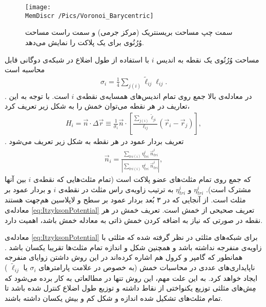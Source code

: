 \begin{figure}[htbp]
\begin{center}
\texttt{[image: \\MemDiscr /Pics/Voronoi\_Barycentric]}

\caption{
سمت چپ مساحت بریسنتریک (مرکز جرمی) و سمت راست مساحت وُرُنُوی برای یک پلاکت را نمایش می‌دهد.
}
\label{fig:voronoiBarycentric}
\end{center}
\end{figure}
مساحت وُرُنُوی
یک نقطه به اندیس 
$i$
با استفاده از طول اضلاع در شبکه‌ی دوگانی قابل محاسبه است
\begin{eqnarray}
\sigma_i=\frac{1}{4}\sum_{j(i)}\tilde\ell_{ij}\ell_{ij}.
\label{eq:voronoiArea}
\end{eqnarray}
. در معادله‌ی بالا جمع روی تمام اندیس‌های همسایه‌ی نقطه‌ی 
$i$
است. با توجه به این تعاریف در هر نقطه می‌توان خمش را به شکل زیر تعریف کرد،
\begin{eqnarray}
H_i=\vec n\cdot\Delta \vec r\equiv\frac{1}{\sigma_i}\vec n \cdot\left[\frac{\sum_{j(i)}\tilde\ell_{ji}}{\ell_{ij}}(\vec r_i-\vec r_j)\right],
\label{eq:meanCurvatureDiscreteSingleVertex}
\end{eqnarray}
. تعریف بردار عمود در هر نقطه به شکل زیر تعریف می‌شود
\cite{Thurrner1998NormalVec}
\begin{eqnarray}
\vec n_i=\frac{\sum_{tri(i)} \eta_{tri}^i~\vec n_{tri}^i}{|\sum_{tri(i)} \eta_{tri}^i~\vec n_{tri}^i|},
\label{eq:noramlVector}
\end{eqnarray}
که جمع روی تمام مثلث‌های عضو پلاکت
است (تمام مثلث‌هایی که نقطه‌ی 
$i$
بین آنها مشترک است). 
$\eta_{tri}^i$
و
$\eta_{tri}^i$
به ترتیب زاویه‌ی راس مثلث در نقطه‌ی 
$i$
و بردار عمود بر مثلث است. از آنجایی که در ۳ بُعد بردار عمود بر سطح و لاپلاسین هم‌جهت هستند
\cite{Gompper1996}
معادله‌ی 
\ref{eq:ItzyksonPotential}
تعریف صحیحی از خمش است. تعریف خمش در هر نقطه در صورتی که نیاز به  اضافه کردن خمش ذاتی به معادله خمش باشد، اهمیت دارد. 

معادله‌ی
\ref{eq:ItzyksonPotential}
برای شبکه‌های مثلثی در نظر گرفته شده که مثلثی با زاویه‌ی منفرجه نداشته باشد و همچنین شکل و اندازه تمام مثلث‌ها تقریبا یکسان باشد
\cite{Itzykson1986}
. همانطور که گامپر و کرول هم اشاره کرده‌اند
\cite{Gompper1996}
در این روش داشتن زوایای منفرجه ناپایداری‌های عددی در محاسبات خمش (به خصوص در علامت پارامتر‌های 
$\sigma_i$
یا
$\tilde\ell_{ij}$
) ایجاد خواهد کرد. به این علت مهم، این روش تنها  در مطالعاتی به کار برده می‌شود  که مِش‌های  مثلثی  توزیع یکنواختی از نقاط داشته و توزیع طول اضلاع کنترل شده باشد تا تمام مثلث‌های تشکیل شده اندازه و شکل کم و بیش یکسان داشته باشند.




